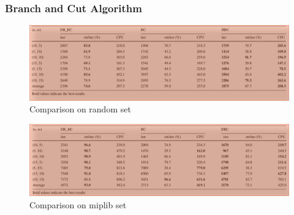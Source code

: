 \documentclass[11pt]{beamer}
\begin{document}
\begin{frame}
	\frametitle{Branch and Cut Algorithm}
	\begin{figure}
		\includegraphics[width=\textwidth]{table_bc_random.png}
		\caption{Comparison on random set}
	\end{figure}
	\begin{figure}
		\includegraphics[width=\textwidth]{table_bc_miplip.png}
		\caption{Comparison on miplib set}
	\end{figure}
\end{frame}
\end{document}
